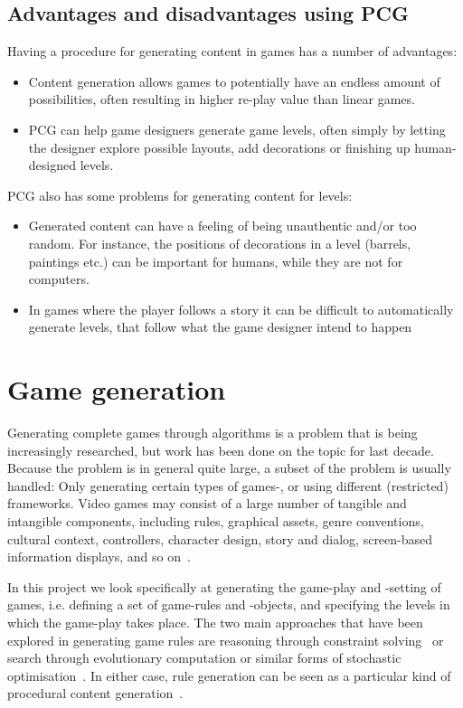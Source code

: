 \documentclass[a4paper,titlepage,final]{report}
\begin{document}
\subsection{Advantages and disadvantages using PCG}

Having a procedure for generating content in games has a number of advantages:

\begin{itemize}
  \item Content generation allows games to potentially have an endless amount of possibilities, often resulting in higher re-play value than linear games. 
  \item PCG can help game designers generate game levels, often simply by letting the designer explore possible layouts, add decorations or finishing up human-designed levels.
\end{itemize}

PCG also has some problems for generating content for levels:

\begin{itemize}
  \item Generated content can have a feeling of being unauthentic and/or too random. For instance, the positions of decorations in a level (barrels, paintings etc.) can be important for humans, while they are not for computers.
  \item In games where the player follows a story it can be difficult to automatically generate levels, that follow what the game designer intend to happen%
\end{itemize}




\section{Game generation}
Generating complete games through algorithms is a problem that is being increasingly researched, but work has been done on the topic for last decade. Because the problem is in general quite large, a subset of the problem is usually handled: Only generating certain types of games-, or using different (restricted) frameworks. 
Video games may consist of a large number of tangible and intangible components, including rules, graphical assets, genre conventions, cultural context, controllers, character design, story and dialog, screen-based information displays, and so on~\citet{cook2014angelina,liapis2014creativity,nelson2007automated}.

In this project we look specifically at generating the game-play and -setting of games, i.e. defining a set of game-rules and -objects, and specifying the levels in which the game-play takes place.
The two main approaches that have been explored in generating game rules are reasoning through constraint solving~\citet{smith2010variations} or search through evolutionary computation or similar forms of stochastic optimisation~\citet{togelius2008experiment,browne2008automated,font2013towards}. 
In either case, rule generation can be seen as a particular kind of procedural content generation~\citet{pcgbook:ch6}.
\end{document}
